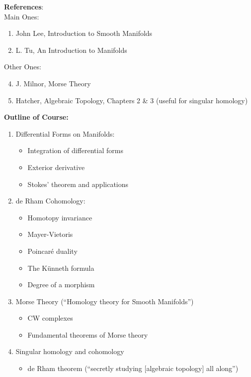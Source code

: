 \documentclass[10pt]{article}
\theoremstyle{plain}
\theoremstyle{definition}
\begin{document}
\textbf{References}:\\
Main Ones:
\begin{enumerate}
    \item John Lee, Introduction to Smooth Manifolds
    \item L. Tu, An Introduction to Manifolds
\end{enumerate}
Other Ones:
\begin{enumerate}
  \setcounter{enumi}{3}
    \item J. Milnor, Morse Theory
    \item Hatcher, Algebraic Topology, Chapters 2 \& 3 (useful for singular homology)
\end{enumerate}
\noindent
\textbf{Outline of Course:}
\begin{enumerate}
    \item Differential Forms on Manifolds:
    \begin{itemize}
        \item Integration of differential forms
        \item Exterior derivative
        \item Stokes' theorem and applications
    \end{itemize}
    \item de Rham Cohomology:
    \begin{itemize}
        \item Homotopy invariance
        \item Mayer-Vietoris
        \item Poincar\'e duality
        \item The Künneth formula
        \item Degree of a morphism
    \end{itemize}
    \item Morse Theory (``Homology theory for Smooth Manifolds'')
    \begin{itemize}
        \item CW complexes
        \item Fundamental theorems of Morse theory
    \end{itemize}
    \item Singular homology and cohomology
    \begin{itemize}
        \item de Rham theorem (``secretly studying [algebraic topology] all along'')
    \end{itemize}
\end{enumerate}
\end{document}
